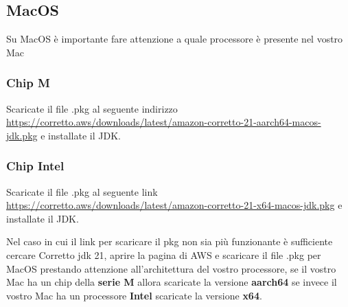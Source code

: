     \subsection{MacOS}
    Su MacOS è importante fare attenzione a quale processore è presente nel vostro Mac
    \subsubsection{Chip M}
        Scaricate il file .pkg al seguente indirizzo \url{https://corretto.aws/downloads/latest/amazon-corretto-21-aarch64-macos-jdk.pkg} e installate il JDK.
    \subsubsection{Chip Intel}
        Scaricate il file .pkg al seguente link \url{https://corretto.aws/downloads/latest/amazon-corretto-21-x64-macos-jdk.pkg} e installate il JDK.
    
    \hfill \break
    Nel caso in cui il link per scaricare il pkg non sia più funzionante è sufficiente cercare Corretto jdk 21, aprire la pagina di AWS e scaricare il file .pkg per MacOS prestando 
    attenzione all'architettura del vostro processore, se il vostro Mac ha un chip della \textbf{serie M} allora scaricate la versione \textbf{aarch64} se invece il vostro Mac
    ha un processore \textbf{Intel} scaricate la versione \textbf{x64}.